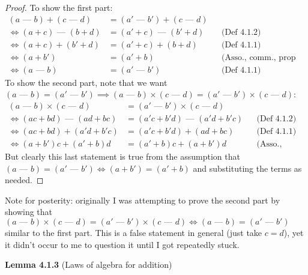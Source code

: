 \documentclass[answers,12pt]{exam}
\newcommand{\fakeminus}{\text{ --- }}
\begin{document}
\begin{solution}
\begin{proof}
    To show the first part:
    \begin{align*}
        (a \fakeminus b) + (c \fakeminus d) &= (a' \fakeminus b') + (c \fakeminus d)\\
        \iff (a+c) \fakeminus (b+d) &= (a' + c) \fakeminus (b' + d) && \text{(Def 4.1.2)}\\
        \iff (a+c) + (b'+d) &= (a' + c) + (b + d)  && \text{(Def 4.1.1)}\\
        \iff (a+b') &= (a'+b)  && \text{(Asso., comm., prop 2.2.6)}\\
        \iff (a \fakeminus b) &= (a' \fakeminus b')  && \text{(Def 4.1.1)}
    \end{align*}
    To show the second part, note that we want $(a \fakeminus b) = (a' \fakeminus b') \implies (a \fakeminus b) \times (c \fakeminus d)  = (a' \fakeminus b') \times (c \fakeminus d)$:
    \begin{align*}
        (a \fakeminus b) \times (c \fakeminus d) &= (a' \fakeminus b') \times (c \fakeminus d) \\
        \iff (ac + bd) \fakeminus (ad + bc) &= (a'c + b'd) \fakeminus (a'd + b'c)&& \text{(Def 4.1.2)} \\
        \iff (ac + bd) + (a'd + b'c) &= (a'c + b'd) + (ad + bc) && \text{(Def 4.1.1)}\\
        \iff (a+b')c + (a'+b)d &= (a'+b)c + (a+b')d && \text{(Asso., comm., dist.)}
    \end{align*}
    But clearly this last statement is true from the assumption that $(a \fakeminus b) = (a' \fakeminus b') \iff (a + b') = (a' + b)$ and substituting the terms as needed.
\end{proof}

Note for posterity: originally I was attempting to prove the second part by showing that $(a \fakeminus b) \times (c \fakeminus d) = (a' \fakeminus b') \times (c \fakeminus d) \iff (a \fakeminus b) = (a' \fakeminus b')$ similar to the first part.
This is a false statement in general (just take $c = d$), yet it didn't occur to me to question it until I got repeatedly stuck.
\end{solution}

\textbf{Lemma 4.1.3} (Laws of algebra for addition)
\end{document}
